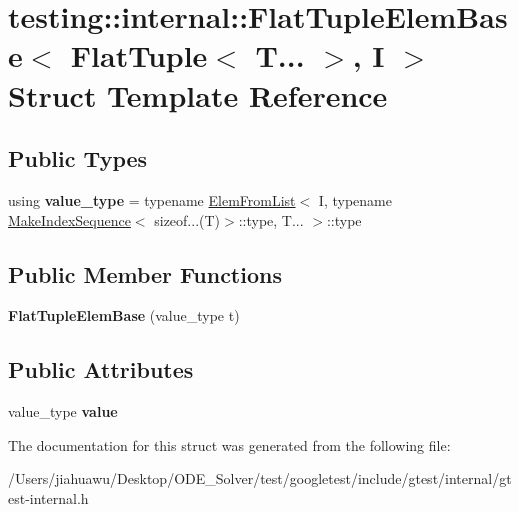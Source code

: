 \hypertarget{structtesting_1_1internal_1_1_flat_tuple_elem_base_3_01_flat_tuple_3_01_t_8_8_8_01_4_00_01_i_01_4}{}\section{testing\+:\+:internal\+:\+:Flat\+Tuple\+Elem\+Base$<$ Flat\+Tuple$<$ T... $>$, I $>$ Struct Template Reference}
\label{structtesting_1_1internal_1_1_flat_tuple_elem_base_3_01_flat_tuple_3_01_t_8_8_8_01_4_00_01_i_01_4}
\subsection*{Public Types}
\begin{DoxyCompactItemize}
\item 
\mbox{\label{structtesting_1_1internal_1_1_flat_tuple_elem_base_3_01_flat_tuple_3_01_t_8_8_8_01_4_00_01_i_01_4_a6b87a445f87724f9363b348e6c697766}} 
using {\bfseries value\+\_\+type} = typename \mbox{\hyperlink{structtesting_1_1internal_1_1_elem_from_list}{Elem\+From\+List}}$<$ I, typename \mbox{\hyperlink{structtesting_1_1internal_1_1_make_index_sequence}{Make\+Index\+Sequence}}$<$ sizeof...(T)$>$\+::type, T... $>$\+::type
\end{DoxyCompactItemize}
\subsection*{Public Member Functions}
\begin{DoxyCompactItemize}
\item 
\mbox{\label{structtesting_1_1internal_1_1_flat_tuple_elem_base_3_01_flat_tuple_3_01_t_8_8_8_01_4_00_01_i_01_4_a153da382b00977dfb5974f85dd31ea58}} 
{\bfseries Flat\+Tuple\+Elem\+Base} (value\+\_\+type t)
\end{DoxyCompactItemize}
\subsection*{Public Attributes}
\begin{DoxyCompactItemize}
\item 
\mbox{\label{structtesting_1_1internal_1_1_flat_tuple_elem_base_3_01_flat_tuple_3_01_t_8_8_8_01_4_00_01_i_01_4_ac175518e7807c0b49c0ba8c1c78269ec}} 
value\+\_\+type {\bfseries value}
\end{DoxyCompactItemize}


The documentation for this struct was generated from the following file\+:\begin{DoxyCompactItemize}
\item 
/\+Users/jiahuawu/\+Desktop/\+O\+D\+E\+\_\+\+Solver/test/googletest/include/gtest/internal/gtest-\/internal.\+h\end{DoxyCompactItemize}
